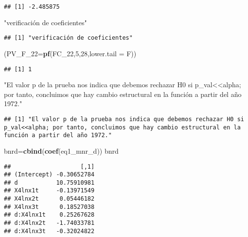 \documentclass[
]{article}
\newenvironment{Shaded}{\begin{snugshade}}{\end{snugshade}}
\newcommand{\DataTypeTok}[1]{\textcolor[rgb]{0.13,0.29,0.53}{#1}}
\newcommand{\DecValTok}[1]{\textcolor[rgb]{0.00,0.00,0.81}{#1}}
\newcommand{\KeywordTok}[1]{\textcolor[rgb]{0.13,0.29,0.53}{\textbf{#1}}}
\newcommand{\NormalTok}[1]{#1}
\newcommand{\StringTok}[1]{\textcolor[rgb]{0.31,0.60,0.02}{#1}}
\begin{document}
\begin{verbatim}
## [1] -2.485875
\end{verbatim}

\begin{Shaded}
\begin{Highlighting}[]
\StringTok{"verificación de coeficientes"}
\end{Highlighting}
\end{Shaded}

\begin{verbatim}
## [1] "verificación de coeficientes"
\end{verbatim}

\begin{Shaded}
\begin{Highlighting}[]
\NormalTok{(}\DataTypeTok{PV_F_22=}\KeywordTok{pf}\NormalTok{(FC_}\DecValTok{22}\NormalTok{,}\DecValTok{5}\NormalTok{,}\DecValTok{28}\NormalTok{,}\DataTypeTok{lower.tail =}\NormalTok{ F))}
\end{Highlighting}
\end{Shaded}

\begin{verbatim}
## [1] 1
\end{verbatim}

\begin{Shaded}
\begin{Highlighting}[]
\StringTok{"El valor p de la prueba nos indica que debemos rechazar H0 si p_val<<alpha; por tanto, concluimos que hay cambio estructural en la función a partir del año 1972."}
\end{Highlighting}
\end{Shaded}

\begin{verbatim}
## [1] "El valor p de la prueba nos indica que debemos rechazar H0 si p_val<<alpha; por tanto, concluimos que hay cambio estructural en la función a partir del año 1972."
\end{verbatim}

\begin{Shaded}
\begin{Highlighting}[]
\NormalTok{bnrd=}\KeywordTok{cbind}\NormalTok{(}\KeywordTok{coef}\NormalTok{(eq1_mnr_d))}
\NormalTok{bnrd}
\end{Highlighting}
\end{Shaded}

\begin{verbatim}
##                    [,1]
## (Intercept) -0.30652784
## d           10.75910981
## X4lnx1t     -0.13971549
## X4lnx2t      0.05446182
## X4lnx3t      0.18527038
## d:X4lnx1t    0.25267628
## d:X4lnx2t   -1.74033781
## d:X4lnx3t   -0.32024822
\end{verbatim}
\end{document}
